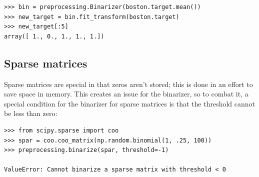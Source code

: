 \documentclass[SKL-MASTER.tex]{subfiles}
\begin{document}
\begin{framed}
	\begin{verbatim}
>>> bin = preprocessing.Binarizer(boston.target.mean())
>>> new_target = bin.fit_transform(boston.target)
>>> new_target[:5]
array([ 1., 0., 1., 1., 1.])
\end{verbatim}
\end{framed}
\subsection*{Sparse matrices}
Sparse matrices are special in that zeros aren't stored; this is done in an effort to save space
in memory. This creates an issue for the binarizer, so to combat it, a special condition for the
binarizer for sparse matrices is that the threshold cannot be less than zero:
\begin{framed}
	\begin{verbatim}
>>> from scipy.sparse import coo
>>> spar = coo.coo_matrix(np.random.binomial(1, .25, 100))
>>> preprocessing.binarize(spar, threshold=-1)

ValueError: Cannot binarize a sparse matrix with threshold < 0
\end{verbatim}
\end{framed}

\newpage
\end{document}

